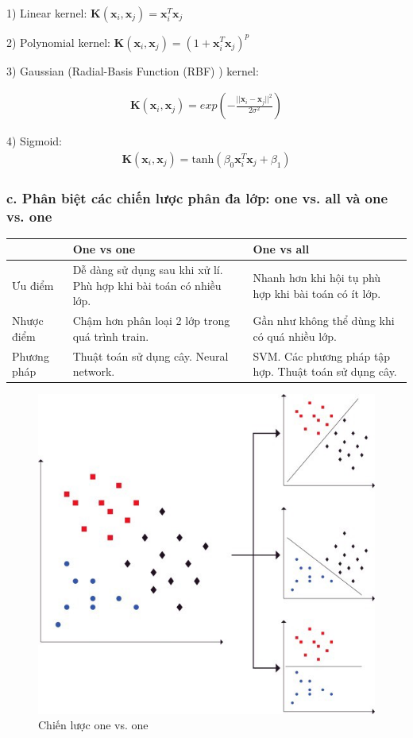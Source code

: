 \documentclass{article}
\newcommand\T{\rule{0pt}{2.6ex}}       %
\newcommand\B{\rule[-1.2ex]{0pt}{0pt}} %
\begin{document}
	1) Linear kernel: $\mathbf{K}(\mathbf{x}_i, \mathbf{x}_j) = \mathbf{x}_i^T\mathbf{x}_j$ 
	
	2) Polynomial kernel: $\mathbf{K}(\mathbf{x}_i, \mathbf{x}_j) = (1 +  \mathbf{x}_i^T\mathbf{x}_j)^p$
	
	3) Gaussian (Radial-Basis Function (RBF) ) kernel:
	
	\begin{gather*}
		\mathbf{K}(\mathbf{x}_i, \mathbf{x}_j) = exp\left(-\frac{||\mathbf{x}_i - \mathbf{x}_j||^2}{2\sigma^2}\right)
	\end{gather*}
	
	4) Sigmoid:
	\begin{gather*}
		\mathbf{K}(\mathbf{x}_i, \mathbf{x}_j) = \text{tanh}(\beta_0\mathbf{x}_i^T\mathbf{x}_j + \beta_1)
	\end{gather*}
	
	
	\subsubsection{c. Phân biệt các chiến lược phân đa lớp: one vs. all và one vs. one}
	
	\begin{table}[H]
		\centering
		\begin{tabular}{| p{5cm} | p{5cm} | p{5cm} |}\hline
			& One vs one& One vs all \T\B\\\hline
		Ưu điểm & Dễ dàng sử dụng sau khi xử lí.
		Phù hợp khi bài toán có nhiều lớp. & Nhanh hơn khi hội tụ
		phù hợp khi bài toán có ít lớp.\T\B\\\hline
		Nhược điểm & Chậm hơn phân loại 2 lớp trong quá trình train. & Gần như không thể dùng khi có quá nhiều lớp.	\T\B\\\hline
		Phương pháp & Thuật toán sử dụng cây. Neural network. & SVM.
		Các phương pháp tập hợp.
		Thuật toán sử dụng cây.\T\B\\\hline
		\end{tabular}
	\end{table}
	
	\begin{figure}[H]
		\centering
		\includegraphics[width=0.75\linewidth]{images/one_vs_one.jpeg}
		\caption{Chiến lược one vs. one}
		\label{fig:writing-thesis}
	\end{figure}
\end{document}
